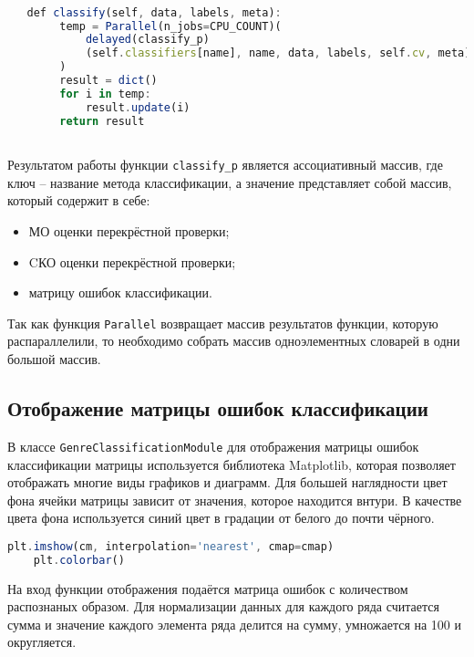 \begin{lstlisting}[language=TypeScript, label=lst:classify]

   def classify(self, data, labels, meta):
        temp = Parallel(n_jobs=CPU_COUNT)(
            delayed(classify_p)
            (self.classifiers[name], name, data, labels, self.cv, meta) for name in self.classifiers
        )
        result = dict()
        for i in temp:
            result.update(i)
        return result



\end{lstlisting}

Результатом работы функции \texttt{classify\_p} является ассоциативный массив, где ключ -- название метода классификации, а значение представляет собой массив, который содержит в себе:
\begin{itemize}
    \item МО оценки перекрёстной проверки;
    \item CКО оценки перекрёстной проверки;
    \item матрицу ошибок классификации.
\end{itemize}

Так как функция \texttt{Parallel} возвращает массив результатов функции, которую распараллелили, то необходимо собрать массив одноэлементных словарей в одни большой массив.


\subsection{Отображение матрицы ошибок классификации}

В классе \texttt{GenreClassificationModule} для  отображения матрицы ошибок классификации матрицы используется библиотека Matplotlib, которая позволяет отображать многие виды графиков и диаграмм. Для большей наглядности цвет фона ячейки матрицы зависит от значения, которое находится внтури. В качестве цвета фона используется синий цвет в градации от белого до почти чёрного.

\begin{lstlisting}[language=TypeScript, label=lst:normalize]
    plt.imshow(cm, interpolation='nearest', cmap=cmap)
    plt.colorbar()
\end{lstlisting}

На вход функции отображения подаётся матрица ошибок с количеством распознаных образом. Для нормализации данных для каждого ряда считается сумма и значение каждого элемента ряда делится на сумму, умножается на 100 и округляется.

